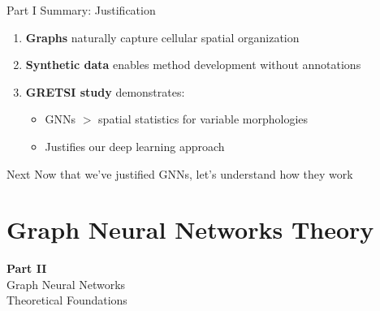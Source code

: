\documentclass[aspectratio=169]{beamer}
\begin{document}
\begin{frame}{Part I Summary: Justification}
    \begin{enumerate}
        \item \textbf{Graphs} naturally capture cellular spatial organization
        
        \vspace{0.5em}
        \item \textbf{Synthetic data} enables method development without annotations
        
        \vspace{0.5em}
        \item \textbf{GRETSI study} demonstrates:
        \begin{itemize}
            \item GNNs $>$ spatial statistics for variable morphologies
            \item Justifies our deep learning approach
        \end{itemize}
    \end{enumerate}
    
    \vspace{0.5em}
    \begin{alertblock}{Next}
        Now that we've justified GNNs, let's understand how they work
    \end{alertblock}
\end{frame}

\section{Graph Neural Networks Theory}

\begin{frame}
    \begin{center}
        {\Huge \textbf{Part II}}\\[1em]
        {\LARGE Graph Neural Networks}\\[0.5em]
        {\large Theoretical Foundations}
    \end{center}
\end{frame}
\end{document}
